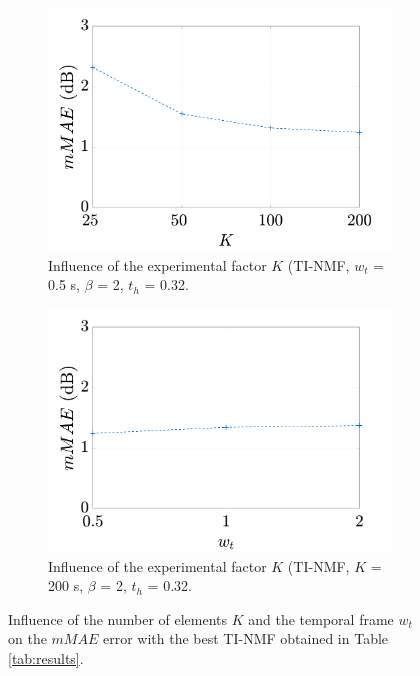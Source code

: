 \documentclass[review,5p,twocolumn,sort&compress,times]{elsarticle}
\begin{document}
\begin{figure}[t!]
\centering
\begin{subfigure}{0.45\textwidth}
\includegraphics[width=\linewidth]{./figures/evolutionK_AA.pdf}
\caption{Influence of the experimental factor $K$ (TI-NMF, $w_t$ = 0.5 s, $\beta$ = 2, $t_h$ = 0.32.} \label{fig:grafic_K}
\end{subfigure}
\begin{subfigure}{0.45\textwidth}
\includegraphics[width=\linewidth]{./figures/evolutionWt_AA.pdf}
\caption{Influence of the experimental factor $K$ (TI-NMF, $K$ = 200 s, $\beta$ = 2, $t_h$ = 0.32.} \label{fig:grafic_wt}
\end{subfigure}
\caption{Influence of the number of elements $K$  and the temporal frame $w_t$  on the $mMAE$ error with the best TI-NMF obtained in Table \ref{tab:results}.} \label{fig:grafic_K_wt}
\end{figure}
\end{document}

